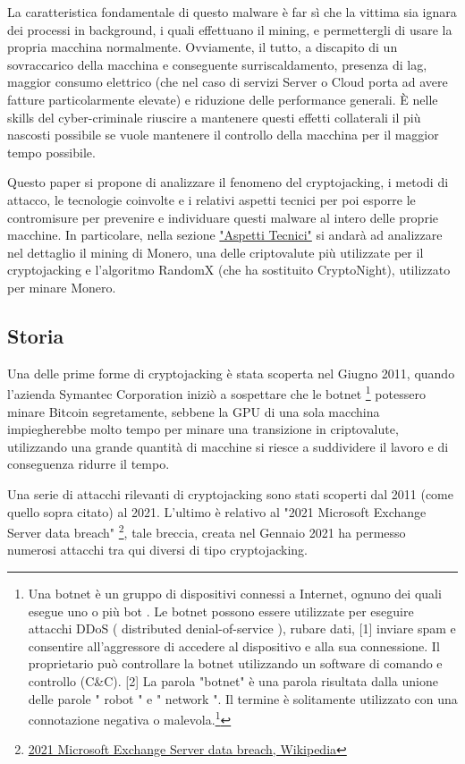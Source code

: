 \documentclass[12pt,a4paper]{article}
\begin{document}
La caratteristica fondamentale di questo malware è far sì che la vittima sia
ignara dei processi in background, i quali effettuano il mining, e
permettergli di usare la propria macchina normalmente. Ovviamente, il tutto, a
discapito di un sovraccarico della macchina e conseguente surriscaldamento,
presenza di lag, maggior consumo elettrico (che nel caso di servizi Server o
Cloud porta ad avere fatture particolarmente elevate) e riduzione delle
performance generali. È nelle skills del cyber-criminale riuscire a mantenere 
questi effetti collaterali il più nascosti possibile se vuole mantenere il controllo della macchina per il maggior tempo possibile.

Questo paper si propone di analizzare il fenomeno del cryptojacking, i metodi di
attacco, le tecnologie coinvolte e i relativi aspetti tecnici per poi esporre le
contromisure per prevenire e individuare questi malware al intero delle proprie
macchine. In particolare, nella sezione \hyperref[sec:aspetti_tecnici]{"Aspetti
Tecnici"} si andarà ad analizzare nel dettaglio il mining di Monero, una delle
criptovalute più utilizzate per il cryptojacking e l'algoritmo RandomX (che ha
sostituito CryptoNight), utilizzato per minare Monero.

\subsection{Storia}

Una delle prime forme di cryptojacking è stata scoperta nel Giugno 2011, quando
l'azienda Symantec Corporation iniziò a sospettare che le botnet \footnote{Una
botnet è un gruppo di dispositivi connessi a Internet, ognuno dei quali esegue
uno o più bot . Le botnet possono essere utilizzate per eseguire attacchi DDoS (
distributed denial-of-service ), rubare dati, [1] inviare spam e consentire
all'aggressore di accedere al dispositivo e alla sua connessione. Il
proprietario può controllare la botnet utilizzando un software di comando e
controllo (C\&C). [2] La parola "botnet" è una parola risultata dalla unione
delle parole " robot " e " network ". Il termine è solitamente utilizzato con
una connotazione negativa o
malevola.\footnote{\href{https://arc.net/l/quote/ftyxgxms}{Botnet, Wikipedia}}}
potessero minare Bitcoin segretamente, sebbene la GPU di una sola macchina
impiegherebbe molto tempo per minare una transizione in criptovalute,
utilizzando una grande quantità di macchine si riesce a suddividere il lavoro e
di conseguenza ridurre il tempo.

Una serie di attacchi rilevanti di cryptojacking sono stati scoperti dal 2011
(come quello sopra citato) al 2021. L'ultimo è relativo al "2021 Microsoft
Exchange Server data breach"
\footnote{\href{https://arc.net/l/quote/golshtco}{2021 Microsoft Exchange Server
data breach, Wikipedia}}, tale breccia, creata nel Gennaio 2021 ha permesso
numerosi attacchi tra qui diversi di tipo cryptojacking.
\end{document}
